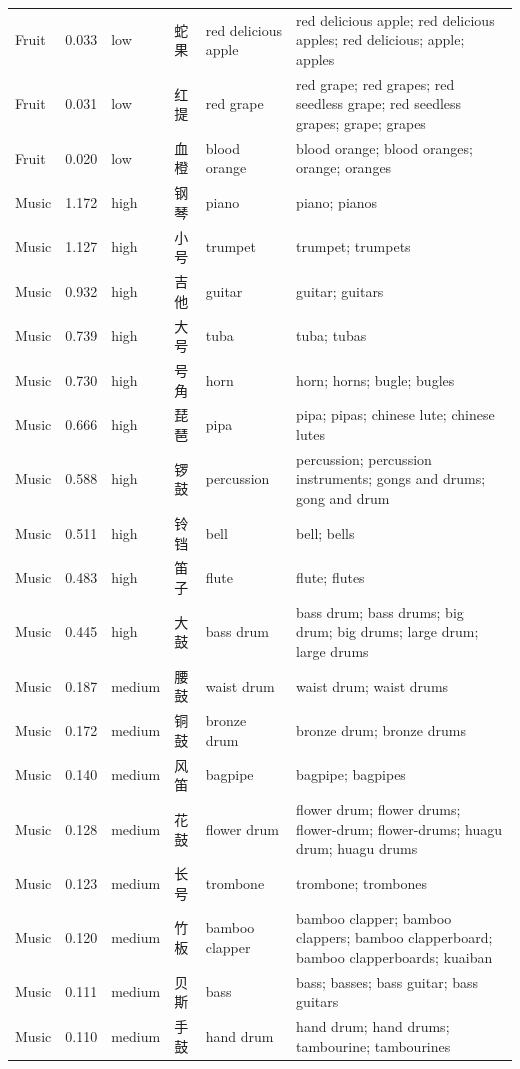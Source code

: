 {\begin{longtable}[c]{@{}>{\raggedright\arraybackslash}p{1.85cm}l l l>{\raggedright\arraybackslash}p{1.85cm}>{\raggedright\arraybackslash}p{8.10cm}@{}}
Fruit & 0.033 & low & 蛇果 & red delicious apple & red delicious apple; red delicious apples; red delicious; apple; apples \\
Fruit & 0.031 & low & 红提 & red grape & red grape; red grapes; red seedless grape; red seedless grapes; grape; grapes \\
Fruit & 0.020 & low & 血橙 & blood orange & blood orange; blood oranges; orange; oranges \\
Music & 1.172 & high & 钢琴 & piano & piano; pianos \\
Music & 1.127 & high & 小号 & trumpet & trumpet; trumpets \\
Music & 0.932 & high & 吉他 & guitar & guitar; guitars \\
Music & 0.739 & high & 大号 & tuba & tuba; tubas \\
Music & 0.730 & high & 号角 & horn & horn; horns; bugle; bugles \\
Music & 0.666 & high & 琵琶 & pipa & pipa; pipas; chinese lute; chinese lutes \\
Music & 0.588 & high & 锣鼓 & percussion & percussion; percussion instruments; gongs and drums; gong and drum \\
Music & 0.511 & high & 铃铛 & bell & bell; bells \\
Music & 0.483 & high & 笛子 & flute & flute; flutes \\
Music & 0.445 & high & 大鼓 & bass drum & bass drum; bass drums; big drum; big drums; large drum; large drums \\
Music & 0.187 & medium & 腰鼓 & waist drum & waist drum; waist drums \\
Music & 0.172 & medium & 铜鼓 & bronze drum & bronze drum; bronze drums \\
Music & 0.140 & medium & 风笛 & bagpipe & bagpipe; bagpipes \\
Music & 0.128 & medium & 花鼓 & flower drum & flower drum; flower drums; flower-drum; flower-drums; huagu drum; huagu drums \\
Music & 0.123 & medium & 长号 & trombone & trombone; trombones \\
Music & 0.120 & medium & 竹板 & bamboo clapper & bamboo clapper; bamboo clappers; bamboo clapperboard; bamboo clapperboards; kuaiban \\
Music & 0.111 & medium & 贝斯 & bass & bass; basses; bass guitar; bass guitars \\
Music & 0.110 & medium & 手鼓 & hand drum & hand drum; hand drums; tambourine; tambourines \\

\end{longtable}}
